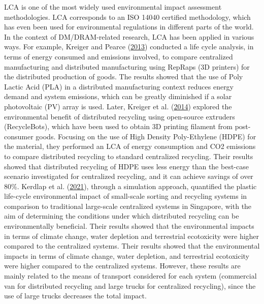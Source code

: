 \documentclass[12pt]{elsarticle} %
\begin{document}
LCA is one of the most widely used environmental impact assessment methodologies. LCA corresponds to an ISO 14040 certified methodology, which has even been used for environmental regulations in different parts of the world.
In the context of DM/DRAM-related research, LCA has been applied in various ways.
For example, Kreiger and Pearce (\protect\hyperlink{ref-Kreiger2013}{2013}) conducted a life cycle analysis, in terms of energy consumed and emissions involved, to compare centralized manufacturing and distributed manufacturing using RepRaps (3D printers) for the distributed production of goods.
The results showed that the use of Poly Lactic Acid (PLA) in a distributed manufacturing context reduces energy demand and system emissions, which can be greatly diminished if a solar photovoltaic (PV) array is used.
Later, Kreiger et al. (\protect\hyperlink{ref-Kreiger2014}{2014}) explored the environmental benefit of distributed recycling using open-source extruders (RecycleBots), which have been used to obtain 3D printing filament from post-consumer goods.
Focusing on the use of High Density Poly-Ethylene (HDPE) for the material, they performed an LCA of energy consumption and CO2 emissions to compare distributed recycling to standard centralized recycling.
Their results showed that distributed recycling of HDPE uses less energy than the best-case scenario investigated for centralized recycling, and it can achieve savings of over 80\%.
Kerdlap et al. (\protect\hyperlink{ref-Kerdlap2021}{2021}), through a simulation approach, quantified the plastic life-cycle environmental impact of small-scale sorting and recycling systems in comparison to traditional large-scale centralized systems in Singapore, with the aim of determining the conditions under which distributed recycling can be environmentally beneficial.
Their results showed that the environmental impacts in terms of climate change, water depletion and terrestrial ecotoxicity were higher compared to the centralized systems.
Their results showed that the environmental impacts in terms of climate change, water depletion, and terrestrial ecotoxicity were higher compared to the centralized systems. However, these results are mainly related to the means of transport considered for each system (commercial van for distributed recycling and large trucks for centralized recycling), since the use of large trucks decreases the total impact.
\end{document}
